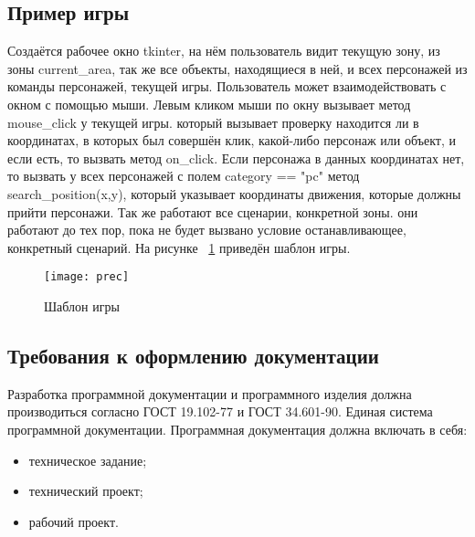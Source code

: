 \subsection{Пример игры}
Создаётся рабочее окно tkinter, на нём пользователь видит текущую зону, из зоны current\_area, так же все объекты, находящиеся в ней, и всех персонажей из команды персонажей, текущей игры. Пользователь может взаимодействовать с окном с помощью мыши. Левым кликом мыши по окну вызывает метод mouse\_click у текущей игры. который вызывает проверку находится ли в координатах, в которых был совершён клик, какой-либо персонаж или объект, и если есть, то вызвать метод on\_click. Если персонажа в данных координатах нет, то вызвать у всех персонажей с полем category == "pc" метод search\_position(x,y), который указывает координаты движения, которые должны прийти персонажи. Так же работают все сценарии, конкретной зоны. они работают до тех пор, пока не будет вызвано условие останавливающее, конкретный сценарий.
На рисунке ~\ref{prec:image} приведён шаблон игры.
\begin{figure}[H]
	\texttt{[image: prec]}
	\caption{Шаблон игры}
	\label{prec:image}
\end{figure}

\subsection{Требования к оформлению документации}

Разработка программной документации и программного изделия должна производиться согласно ГОСТ 19.102-77 и ГОСТ 34.601-90. Единая система программной документации.
Программная документация должна включать в себя:
\begin{itemize}
	\item техническое задание;
	\item технический проект;
	\item рабочий проект.
\end{itemize}